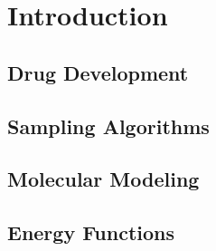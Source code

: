 \chapter{Introduction}
\label{chapter:intro}

\section{Drug Development}
\label{section:drug_development}


\section{Sampling Algorithms}
\label{section:sampling_algorithms}


\section{Molecular Modeling}
\label{section:molecular_modeling}


\section{Energy Functions}
\label{section:energy_functions}

